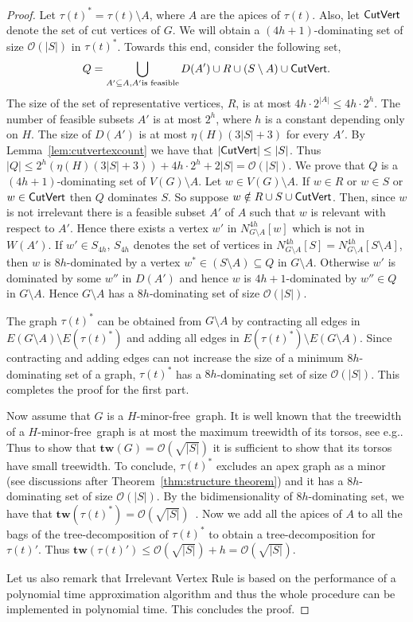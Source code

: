 \documentclass[11pt]{article}
\newcommand{\tw}{{\mathbf{tw}}}
\newcommand{\Hmf}{$H$-minor-free}
\newcommand{\cO}{\mathcal{O}}
\begin{document}
\begin{proof}
Let $\tau(t)^*= \tau(t) \setminus A$, where $A$ are the apices of $\tau(t)$. Also, let ${\sf CutVert}$ denote the set of cut vertices of $G$. 
We will obtain a $(4h+1)$-dominating set of size $\cO(|S|)$ in $\tau(t)^*$. Towards this end, consider the following set, 
$$Q=\bigcup_{A' \subseteq A, A' \text{is feasible} }D(A')\cup R\cup (S \setminus A) \cup {\sf CutVert} .$$
The size of the set of representative vertices, $R$, is at most $4h \cdot 2^{|A|}\leq 4h \cdot 2^h$. The number of feasible subsets $A'$ is at most $2^h$, where $h$ is a constant depending only on $H$. The size of $D(A')$ is at most $\eta(H)(3|S|+3)$ for every $A'$. By Lemma~\ref{lem:cutvertexcount} we have that $|{\sf CutVert}|\leq |S|$. Thus  $|Q|\leq 2^h (\eta(H)(3|S|+3)) + 4h \cdot 2^h + 2 |S|=\cO(|S|)$. We prove that $Q$ is a $(4h+1)$-dominating set of $V(G) \setminus A$. Let $w \in V(G) \setminus A$. If $w \in R$ or $w \in S$ or $w\in {\sf CutVert}$ then $Q$ dominates $S$. So suppose $w \notin R \cup S \cup {\sf CutVert}$. Then, since $w$ is not irrelevant there is a feasible subset $A'$ of $A$ such that $w$ is relevant with respect to $A'$. Hence there exists a vertex $w'$ in $N_{G\setminus A}^{4h}[w]$ which is not in $W(A')$. If $w' \in S_{4h}$, $S_{4h}$ denotes the set of vertices in $N_{G\setminus A}^{4h}[S]=N_{G\setminus A}^{4h}[S\setminus A]$, 
 then $w$ is $8h$-dominated by a vertex  $w^* \in (S\setminus A) \subseteq Q$ in $G \setminus A$. Otherwise $w'$ is dominated by some $w''$ in $D(A')$ and hence $w$ is $4h+1$-dominated by $w'' \in Q$ in $G \setminus A$. Hence $G \setminus A$ has a $8h$-dominating set of size $\cO(|S|)$.

The graph $\tau(t)^*$ can be obtained from $G \setminus A$ by contracting all edges in $E(G \setminus A) \setminus E(\tau(t)^*)$ and adding all edges in $E(\tau(t)^*) \setminus E(G \setminus A)$. Since contracting and adding edges can not increase the size of a minimum $8h$-dominating set of a graph, $\tau(t)^*$ has a $8h$-dominating set of size $\cO(|S|)$.
This completes the proof for the first part.

Now assume that $G$ is a \Hmf \, graph. It is well known  that the treewidth of a \Hmf \, graph is at most the maximum treewidth of its torsos, see e.g.\cite{DemaineFHT05sub}. Thus to show that $\tw(G)=\cO(\sqrt{|S|})$ it is sufficient to show that its torsos have small treewidth.  
To conclude, $\tau(t)^*$ excludes an apex graph as a minor  (see discussions after Theorem~\ref{thm:structure theorem}) and it has a $8h$-dominating set of size $\cO(|S|)$. By the bidimensionality of $8h$-dominating set, we have that $\tw(\tau(t)^*)=\cO(\sqrt{|S|})$~\cite{DemaineFHT05sub,FominGT09con}. Now we add all the apices of $A$ to all the bags of the tree-decomposition  of $\tau(t)^*$ to obtain a tree-decomposition for $\tau(t)'$.  Thus $\tw(\tau(t)')\leq \cO(\sqrt{|S|})+h =\cO(\sqrt{|S|})$. 

Let us also remark that Irrelevant Vertex Rule is based on the performance of a polynomial time approximation algorithm and thus the whole procedure can be implemented in polynomial time. This concludes the proof. 
\end{proof}
\end{document}
